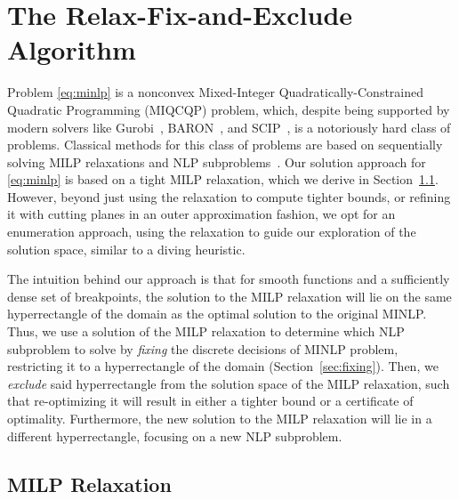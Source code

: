 \documentclass[pdflatex,sn-mathphys-num]{sn-jnl}%
\newcommand{\new}[1]{#1}
\begin{document}

\section{The Relax-Fix-and-Exclude Algorithm} \label{algorithm}


\new{Problem \ref{eq:minlp} is a nonconvex Mixed-Integer Quadratically-Constrained Quadratic Programming (MIQCQP) problem, which, despite being supported by modern solvers like Gurobi~\citep{gurobi}, BARON~\cite{sahinidisBARONGeneralPurpose1996,zhangSolvingContinuousDiscrete2024}, and SCIP~\cite{BolusaniEtal2024OO,BolusaniEtal2024ZR},} is a notoriously hard class of problems.
\new{%
Classical methods for this class of problems are based on sequentially solving MILP relaxations and NLP subproblems~\citep{BIEGLER20041169}.
Our solution approach for \ref{eq:minlp} is based on a tight MILP relaxation, which we derive in Section~\ref{sec:milp-relaxation}.
However, beyond just using the relaxation to compute tighter bounds, or refining it with cutting planes in an outer approximation fashion, we opt for an enumeration approach, using the relaxation to guide our exploration of the solution space, similar to a diving heuristic.
}

\new{%
The intuition behind our approach is that for smooth functions and a sufficiently dense set of breakpoints, the solution to the MILP relaxation will lie on the same hyperrectangle of the domain as the optimal solution to the original MINLP.
Thus, we use a solution of the MILP relaxation to determine which NLP subproblem to solve by \emph{fixing} the discrete decisions of MINLP problem, restricting it to a hyperrectangle of the domain (Section~\ref{sec:fixing}).
Then, we \emph{exclude} said hyperrectangle from the solution space of the MILP relaxation, such that re-optimizing it will result in either a tighter bound or a certificate of optimality.
Furthermore, the new solution to the MILP relaxation will lie in a different hyperrectangle, focusing on a new NLP subproblem.
}

\subsection{MILP Relaxation}\label{sec:milp-relaxation}
\end{document}

